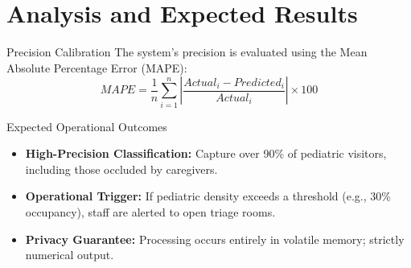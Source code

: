 \section{Analysis and Expected Results}

\begin{frame}{Precision Calibration}
    The system's precision is evaluated using the Mean Absolute Percentage Error (MAPE):
    \begin{equation}
        MAPE = \frac{1}{n} \sum_{i=1}^{n} \left| \frac{Actual_i - Predicted_i}{Actual_i} \right| \times 100
    \end{equation}
\end{frame}

\begin{frame}{Expected Operational Outcomes}
    \begin{itemize}
        \item \textbf{High-Precision Classification:} Capture over 90\% of pediatric visitors, including those occluded by caregivers.
        \item \textbf{Operational Trigger:} If pediatric density exceeds a threshold (e.g., 30\% occupancy), staff are alerted to open triage rooms.
        \item \textbf{Privacy Guarantee:} Processing occurs entirely in volatile memory; strictly numerical output.
    \end{itemize}
\end{frame}
